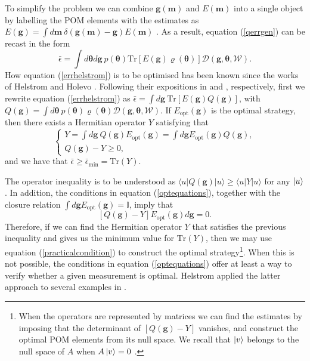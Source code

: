 To simplify the problem we can combine $\boldsymbol{g}(\boldsymbol{m})$ and $E(\boldsymbol{m})$ into a single object by labelling the POM elements with the estimates as $E(\boldsymbol{g}) = \int d\boldsymbol{m}~\delta\left(\boldsymbol{g}(\boldsymbol{m})-\boldsymbol{g}\right) E(\boldsymbol{m})$ \cite{rafal2015}. As a result, equation (\ref{qerrgen}) can be recast in the form
\begin{equation}
\bar{\epsilon} = \int d\boldsymbol{\theta} d\boldsymbol{g} ~p(\boldsymbol{\theta})\mathrm{Tr}\left[E(\boldsymbol{g})\varrho(\boldsymbol{\theta})\right]\mathcal{D}(\boldsymbol{g},\boldsymbol{\theta}, \mathcal{W}).
\label{errhelstrom} 
\end{equation} 
How equation (\ref{errhelstrom}) is to be optimised has been known since the works of Helstrom \cite{helstrom1976, helstrom1974} and Holevo \cite{holevo1973b, holevo1973}. Following their expositions in \cite{helstrom1976} and \cite{holevo1973b}, respectively, first we rewrite equation (\ref{errhelstrom}) as $\bar{\epsilon} = \int  d\boldsymbol{g} ~\mathrm{Tr}\left[E(\boldsymbol{g})Q(\boldsymbol{g})\right]$, with $Q(\boldsymbol{g}) = \int d\boldsymbol{\theta}  ~p(\boldsymbol{\theta})\varrho(\boldsymbol{\theta})\mathcal{D}(\boldsymbol{g},\boldsymbol{\theta}, \mathcal{W})$. If $E_\mathrm{opt}(\boldsymbol{g})$ is the optimal strategy, then there exists a Hermitian operator $Y$ satisfying that 
\begin{equation}
\begin{cases}
Y = \int d\boldsymbol{g} ~Q(\boldsymbol{g}) E_\mathrm{opt}(\boldsymbol{g}) = \int d\boldsymbol{g} E_\mathrm{opt}(\boldsymbol{g}) Q(\boldsymbol{g}), \\
Q(\boldsymbol{g}) - Y \geqslant 0,
\end{cases}
\label{optequations}
\end{equation}
and we have that $\bar{\epsilon} \geqslant \bar{\epsilon}_{\mathrm{min}} = \mathrm{Tr}(Y)$.

The operator inequality is to be understood as $\langle u| Q(\boldsymbol{g}) |u \rangle \geqslant \langle u| Y |u \rangle $ for any $\ket{u}$. In addition, the conditions in equation (\ref{optequations}), together with the closure relation $\int d\boldsymbol{g} E_\mathrm{opt}(\boldsymbol{g}) = \mathbb{I}$, imply that 
\begin{equation}
\left[Q(\boldsymbol{g}) - Y \right]E_\mathrm{opt}(\boldsymbol{g})d\boldsymbol{g} = 0.
\label{practicalcondition}
\end{equation}
Therefore, if we can find the Hermitian operator $Y$ that satisfies the previous inequality and gives us the minimum value for $\mathrm{Tr}(Y)$, then we may use equation (\ref{practicalcondition}) to construct the optimal strategy\footnote{When the operators are represented by matrices we can find the estimates by imposing that the determinant of $\left[Q(\boldsymbol{g}) - Y \right]$ vanishes, and construct the optimal POM elements from its null space. We recall that $\ket{v}$ belongs to the null space of $A$ when $A \ket{v} = 0 $ \cite{mathematics2004}.}. When this is not possible, the conditions in equation (\ref{optequations}) offer at least a way to verify whether a given measurement is optimal. Helstrom applied the latter approach to several examples in \cite{helstrom1976}. 

